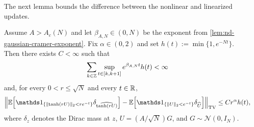 \documentclass[11pt,reqno,a4paper]{article}
\newcommand{\Ee}{\E}
\begin{document}
The next lemma bounds the difference between the nonlinear and linearized
updates.
\begin{lemma}
\label{lem:nd-gaussian-polar-perturbation}
  Assume $A>A_c(N)$ and let $\beta_{A,N}\in(0,N)$ be the exponent from
  \cref{lem:nd-gaussian-cramer-exponent}. Fix $\alpha\in(0,2)$ and set
  $h(t):=\min\{1,e^{-Nt}\}$. Then there exists $C<\infty$ such that
  \begin{equation}\label{eq:nd-polar-envelope-dri}
    \sum_{k\in\mathbb{Z}}
    \sup_{t\in[k,k+1]} e^{\beta_{A,N}t}h(t)<\infty
  \end{equation}
  and, for every $0<r\leq\sqrt N$ and every $t\in\mathbb{R}$,
  \begin{equation}\label{eq:nd-polar-kernel-error}
    \left\|
      \Ee\left[
        \one_{\{\norm{\tanh(rU)}_2<re^{-t}\}}
        \delta_{\widehat{\tanh(rU)}}
      \right]
      -
      \Ee\left[
        \one_{\{\norm U_2<e^{-t}\}}\delta_{\hat U}
      \right]
    \right\|_{\mathrm{TV}}
    \leq
    C r^\alpha h(t),
  \end{equation}
  where $\delta_z$ denotes the Dirac mass at $z$, $U=(A/\sqrt N)G$, and
  $G\sim\mathcal N(0,I_N)$.
\end{lemma}
\end{document}

